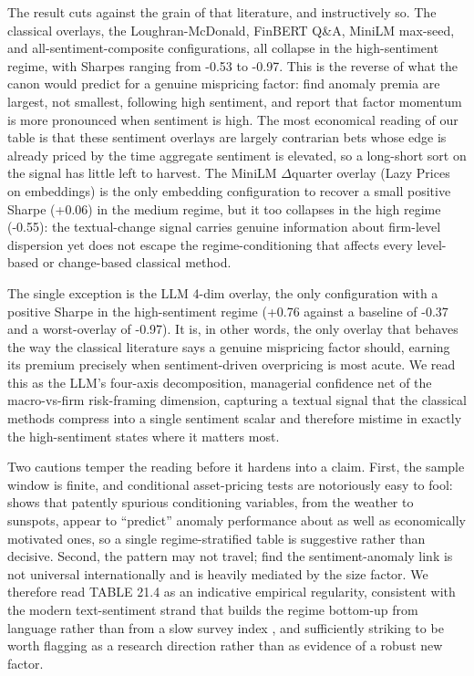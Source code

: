 The result cuts against the grain of that literature, and instructively so. The classical overlays, the Loughran-McDonald, FinBERT Q\&A, MiniLM max-seed, and all-sentiment-composite configurations, all collapse in the high-sentiment regime, with Sharpes ranging from -0.53 to -0.97. This is the reverse of what the canon would predict for a genuine mispricing factor: \cite{stambaugh2012short} find anomaly premia are largest, not smallest, following high sentiment, and \cite{grobys2021factor} report that factor momentum is more pronounced when sentiment is high. The most economical reading of our table is that these sentiment overlays are largely contrarian bets whose edge is already priced by the time aggregate sentiment is elevated, so a long-short sort on the signal has little left to harvest. The MiniLM $\Delta$quarter overlay (Lazy Prices on embeddings) is the only embedding configuration to recover a small positive Sharpe (+0.06) in the medium regime, but it too collapses in the high regime (-0.55): the textual-change signal carries genuine information about firm-level dispersion yet does not escape the regime-conditioning that affects every level-based or change-based classical method.

The single exception is the LLM 4-dim overlay, the only configuration with a positive Sharpe in the high-sentiment regime (+0.76 against a baseline of -0.37 and a worst-overlay of -0.97). It is, in other words, the only overlay that behaves the way the classical literature says a genuine mispricing factor should, earning its premium precisely when sentiment-driven overpricing is most acute. We read this as the LLM's four-axis decomposition, managerial confidence net of the macro-vs-firm risk-framing dimension, capturing a textual signal that the classical methods compress into a single sentiment scalar and therefore mistime in exactly the high-sentiment states where it matters most.

Two cautions temper the reading before it hardens into a claim. First, the sample window is finite, and conditional asset-pricing tests are notoriously easy to fool: \cite{novymarx2014predicting} shows that patently spurious conditioning variables, from the weather to sunspots, appear to ``predict'' anomaly performance about as well as economically motivated ones, so a single regime-stratified table is suggestive rather than decisive. Second, the pattern may not travel; \cite{salurekinci2023anomalies} find the sentiment-anomaly link is not universal internationally and is heavily mediated by the size factor. We therefore read TABLE 21.4 as an indicative empirical regularity, consistent with the modern text-sentiment strand that builds the regime bottom-up from language rather than from a slow survey index \citep{garcia2013sentiment, calomiris2019news}, and sufficiently striking to be worth flagging as a research direction rather than as evidence of a robust new factor.

